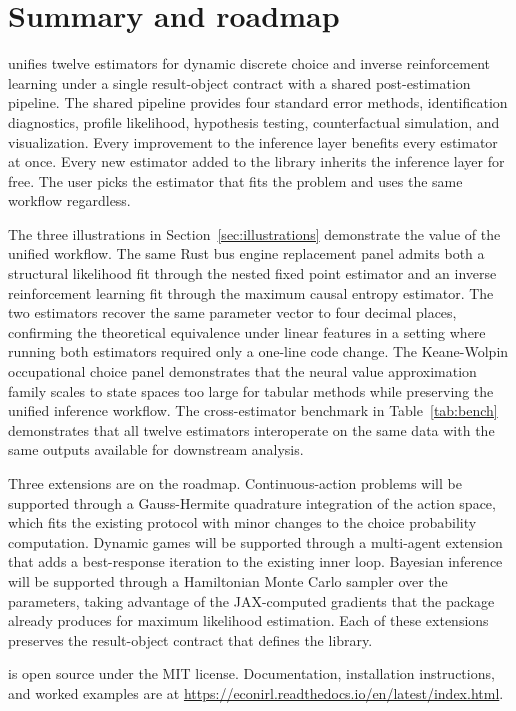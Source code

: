 \section{Summary and roadmap} \label{sec:summary}

 unifies twelve estimators for dynamic discrete choice and inverse reinforcement learning under a single result-object contract with a shared post-estimation pipeline. The shared pipeline provides four standard error methods, identification diagnostics, profile likelihood, hypothesis testing, counterfactual simulation, and visualization. Every improvement to the inference layer benefits every estimator at once. Every new estimator added to the library inherits the inference layer for free. The user picks the estimator that fits the problem and uses the same workflow regardless.

The three illustrations in Section~\ref{sec:illustrations} demonstrate the value of the unified workflow. The same Rust bus engine replacement panel admits both a structural likelihood fit through the nested fixed point estimator and an inverse reinforcement learning fit through the maximum causal entropy estimator. The two estimators recover the same parameter vector to four decimal places, confirming the theoretical equivalence under linear features in a setting where running both estimators required only a one-line code change. The Keane-Wolpin occupational choice panel demonstrates that the neural value approximation family scales to state spaces too large for tabular methods while preserving the unified inference workflow. The cross-estimator benchmark in Table~\ref{tab:bench} demonstrates that all twelve estimators interoperate on the same data with the same outputs available for downstream analysis.

Three extensions are on the roadmap. Continuous-action problems will be supported through a Gauss-Hermite quadrature integration of the action space, which fits the existing protocol with minor changes to the choice probability computation. Dynamic games will be supported through a multi-agent extension that adds a best-response iteration to the existing inner loop. Bayesian inference will be supported through a Hamiltonian Monte Carlo sampler over the parameters, taking advantage of the JAX-computed gradients that the package already produces for maximum likelihood estimation. Each of these extensions preserves the result-object contract that defines the library.

 is open source under the MIT license. Documentation, installation instructions, and worked examples are at \url{https://econirl.readthedocs.io/en/latest/index.html}.
